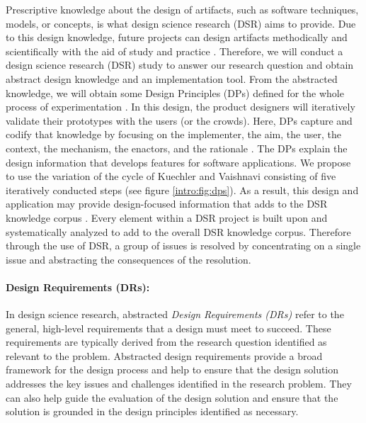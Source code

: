Prescriptive knowledge about the design of artifacts, such as software techniques, models, or concepts, is what design science research (DSR) aims to provide.
Due to this design knowledge, future projects can design artifacts methodically and scientifically with the aid of study and practice \cite{paper:designprinciple:vk}. 
Therefore, we will conduct a design science research (DSR) study to answer our research question and obtain abstract design knowledge and an implementation tool. 
From the abstracted knowledge, we will obtain some Design Principles (DPs) defined for the whole process of experimentation \cite{paper:designprinciple:vk}.
In this design, the product designers will iteratively validate their prototypes with the users (or the crowds). 
Here, DPs capture and codify that knowledge by focusing on the implementer, the aim, the user, the context, the mechanism, the enactors, and the rationale \cite{paper:designprinciple:gregor}. 
The DPs explain the design information that develops features for software applications.
We propose to use the variation of the cycle of Kuechler and Vaishnavi \cite{paper:designprinciple:vk} consisting of five iteratively conducted steps (see figure \ref{intro:fig:dps}). 
As a result, this design and application may provide design-focused information that adds to the DSR knowledge corpus \cite{misc:dsr:henver}.
Every element within a DSR project is built upon and systematically analyzed to add to the overall DSR knowledge corpus.
Therefore through the use of DSR, a group of issues is resolved by concentrating on a single issue and abstracting the consequences of the resolution.

\paragraph*{Design Requirements (DRs):}
In design science research, abstracted \textit{Design Requirements (DRs)} refer to the general, high-level requirements that a design must meet to succeed. 
These requirements are typically derived from the research question identified as relevant to the problem.
Abstracted design requirements provide a broad framework for the design process and help to ensure that the design solution addresses the key issues and challenges identified in the research problem. 
They can also help guide the evaluation of the design solution and ensure that the solution is grounded in the design principles identified as necessary.

